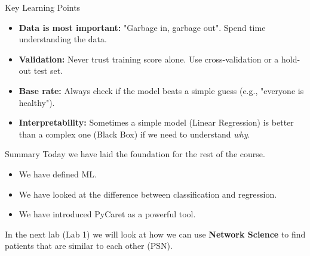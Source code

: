 \documentclass[aspectratio=169]{beamer}
\begin{document}
\begin{frame}{Key Learning Points}
    \begin{itemize}
        \item \textbf{Data is most important:} "Garbage in, garbage out". Spend time understanding the data.
        \item \textbf{Validation:} Never trust training score alone. Use cross-validation or a hold-out test set.
        \item \textbf{Base rate:} Always check if the model beats a simple guess (e.g., "everyone is healthy").
        \item \textbf{Interpretability:} Sometimes a simple model (Linear Regression) is better than a complex one (Black Box) if we need to understand \textit{why}.
    \end{itemize}
\end{frame}

\begin{frame}{Summary}
    Today we have laid the foundation for the rest of the course.
    \begin{itemize}
        \item We have defined ML.
        \item We have looked at the difference between classification and regression.
        \item We have introduced PyCaret as a powerful tool.
    \end{itemize}
    
    In the next lab (Lab 1) we will look at how we can use \textbf{Network Science} to find patients that are similar to each other (PSN).
\end{frame}
\end{document}
